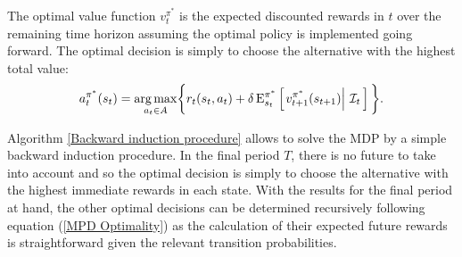\noindent The optimal value function $v^{\pi^*}_t$ is the expected discounted rewards in $t$ over the remaining time horizon assuming the optimal policy is implemented going forward. The optimal decision is simply to choose the alternative with the highest total value:
%
\begin{align*}
a^{\pi^*}_t(s_t) = \underset{a_t\in A}{\operatorname*{arg\,max}} \bigg\{ r_t(s_t, a_t) + \delta\,\mathrm{E}^{\pi^*}_{s_t} \left[\left.v^{\pi^*}_{t + 1}(s_{t + 1})\right\vert\,\mathcal{I}_t\,\right] \bigg\}.\\
\end{align*}

\noindent Algorithm \ref{Backward induction procedure} allows to solve the MDP by a simple backward induction procedure. In the final period $T$, there is no future to take into account and so the optimal decision is simply to choose the alternative with the highest immediate rewards in each state. With the results for the final period at hand, the other optimal decisions can be determined recursively following equation (\ref{MPD Optimality}) as the calculation of their expected future rewards is straightforward given the relevant transition probabilities.

\vspace{0.5cm}\FloatBarrier
